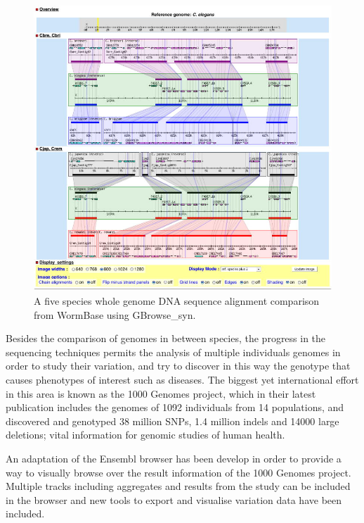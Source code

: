 \begin{figure}  
\centering
\includegraphics[width=\textwidth]{figures/gbrowse_syn.jpg}
\caption[multiple alignment snapshot generated with GBrowse\_syn.]{A five species whole genome DNA sequence alignment comparison from WormBase using GBrowse\_syn.
\label{fig:gbrowsesyn}}
\end{figure}

Besides the comparison of genomes in between species, the progress in the sequencing techniques permits the analysis of multiple individuals genomes in order to study their variation, and try to discover in this way the genotype that causes phenotypes of interest such as diseases. The biggest yet international effort in this area is known as the 1000 Genomes project,  which in their latest publication \cite{GEN2012} includes the genomes of 1092 individuals from 14 populations, and discovered and genotyped 38 million SNPs, 1.4 million indels and 14000 large deletions; vital information for genomic studies of human health.

An adaptation of the Ensembl browser has been develop in order to provide a way to visually browse over the result information of the 1000 Genomes project. Multiple tracks including aggregates and results from the study can be included in the browser and new tools to export and visualise variation data have been included.

